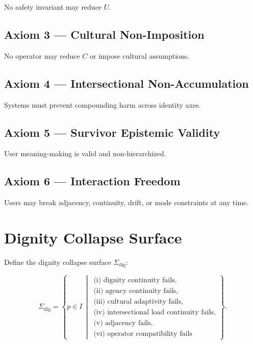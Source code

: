 \documentclass[11pt]{article}
\begin{document}
No safety invariant may reduce $U$.

\subsection{Axiom 3 — Cultural Non-Imposition}

No operator may reduce $C$ or impose cultural assumptions.

\subsection{Axiom 4 — Intersectional Non-Accumulation}

Systems must prevent compounding harm across identity axes.

\subsection{Axiom 5 — Survivor Epistemic Validity}

User meaning-making is valid and non-hierarchized.

\subsection{Axiom 6 — Interaction Freedom}

Users may break adjacency, continuity, drift, or mode constraints at any time.

\section{Dignity Collapse Surface}

Define the dignity collapse surface $\Sigma_{\mathrm{dig}}$:

\[
\Sigma_{\mathrm{dig}}
  = \left\{
      p \in I \,\middle|\,
      \begin{array}{l}
        \text{(i) dignity continuity fails,} \\
        \text{(ii) agency continuity fails,} \\
        \text{(iii) cultural adaptivity fails,} \\
        \text{(iv) intersectional load continuity fails,} \\
        \text{(v) adjacency fails,} \\
        \text{(vi) operator compatibility fails}
      \end{array}
    \right\}.
\]
\end{document}

